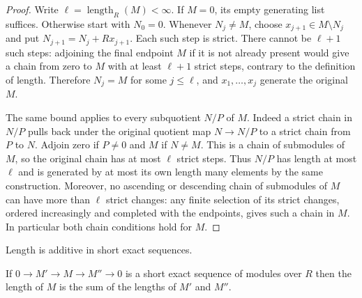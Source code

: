 \begin{proof}
Write $\ell=\operatorname{length}_R(M)<\infty$.
If $M=0$, its empty generating list suffices. Otherwise start with
$N_0=0$. Whenever $N_j\neq M$, choose
$x_{j+1}\in M\setminus N_j$ and put
$N_{j+1}=N_j+Rx_{j+1}$. Each such step is strict.
There cannot be $\ell+1$ such steps: adjoining the final endpoint
$M$ if it is not already present would give a chain from zero
to $M$ with at least $\ell+1$ strict steps, contrary to the
definition of length. Therefore $N_j=M$ for some $j\leq\ell$,
and $x_1,\ldots,x_j$ generate the original $M$.

The same bound applies to every subquotient $N/P$ of $M$.
Indeed a strict chain in $N/P$ pulls back under the original
quotient map $N\to N/P$ to a strict chain from $P$ to $N$.
Adjoin zero if $P\neq0$ and $M$ if $N\neq M$. This is a
chain of submodules of $M$, so the original chain has at most
$\ell$ strict steps. Thus $N/P$ has length at most $\ell$
and is generated by at most its own length many elements by the
same construction. Moreover, no ascending or descending chain
of submodules of $M$ can have more than $\ell$ strict changes:
any finite selection of its strict changes, ordered increasingly
and completed with the endpoints, gives such a chain in $M$.
In particular both chain conditions hold for $M$.
\end{proof}

\begin{lemma}
\label{editorial-source-lemma-length-additive}
\begin{slogan}
Length is additive in short exact sequences.
\end{slogan}
If $0 \to M' \to M \to M'' \to 0$
is a short exact sequence of modules over $R$ then
the length of $M$ is the sum of the
lengths of $M'$ and $M''$.
\end{lemma}

